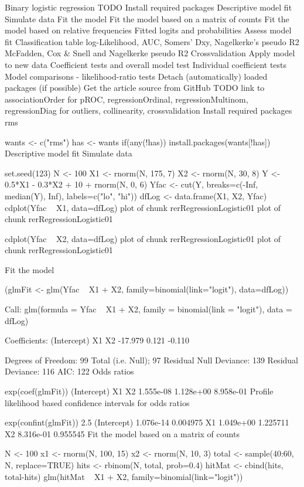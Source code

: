 Binary logistic regression
TODO
Install required packages
Descriptive model fit
Simulate data
Fit the model
Fit the model based on a matrix of counts
Fit the model based on relative frequencies
Fitted logits and probabilities
Assess model fit
Classification table
log-Likelihood, AUC, Somers' Dxy, Nagelkerke's pseudo R2
McFadden, Cox & Snell and Nagelkerke pseudo R2
Crossvalidation
Apply model to new data
Coefficient tests and overall model test
Individual coefficient tests
Model comparisons - likelihood-ratio tests
Detach (automatically) loaded packages (if possible)
Get the article source from GitHub
TODO
link to associationOrder for pROC, regressionOrdinal, regressionMultinom, regressionDiag for outliers, collinearity, crossvalidation
Install required packages
rms

wants <- c("rms")
has   <- wants %
if(any(!has)) install.packages(wants[!has])
Descriptive model fit
Simulate data

set.seed(123)
N     <- 100
X1    <- rnorm(N, 175, 7)
X2    <- rnorm(N,  30, 8)
Y     <- 0.5*X1 - 0.3*X2 + 10 + rnorm(N, 0, 6)
Yfac  <- cut(Y, breaks=c(-Inf, median(Y), Inf), labels=c("lo", "hi"))
dfLog <- data.frame(X1, X2, Yfac)
cdplot(Yfac ~ X1, data=dfLog)
plot of chunk rerRegressionLogistic01
plot of chunk rerRegressionLogistic01

cdplot(Yfac ~ X2, data=dfLog)
plot of chunk rerRegressionLogistic01
plot of chunk rerRegressionLogistic01

Fit the model

(glmFit <- glm(Yfac ~ X1 + X2,
               family=binomial(link="logit"), data=dfLog))

Call:  glm(formula = Yfac ~ X1 + X2, family = binomial(link = "logit"), 
    data = dfLog)

Coefficients:
(Intercept)           X1           X2  
    -17.979        0.121       -0.110  

Degrees of Freedom: 99 Total (i.e. Null);  97 Residual
Null Deviance:      139 
Residual Deviance: 116  AIC: 122 
Odds ratios

exp(coef(glmFit))
(Intercept)          X1          X2 
  1.555e-08   1.128e+00   8.958e-01 
Profile likelihood based confidence intervals for odds ratios

exp(confint(glmFit))
                2.5 %
(Intercept) 1.076e-14 0.004975
X1          1.049e+00 1.225711
X2          8.316e-01 0.955545
Fit the model based on a matrix of counts

N      <- 100
x1     <- rnorm(N, 100, 15)
x2     <- rnorm(N, 10, 3)
total  <- sample(40:60, N, replace=TRUE)
hits   <- rbinom(N, total, prob=0.4)
hitMat <- cbind(hits, total-hits)
glm(hitMat ~ X1 + X2, family=binomial(link="logit"))

